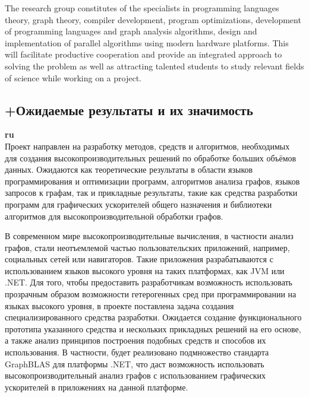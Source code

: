\documentclass[12pt]{article}  %
\theoremstyle{remark}
\begin{document}
The research group constitutes of the specialists in programming languages theory, graph theory, compiler development, program optimizations, development of programming languages and graph analysis algorithms, design and implementation of parallel algorithms using modern hardware platforms. This will facilitate productive cooperation and provide an integrated approach to solving the problem as well as attracting talented students to study relevant fields of science while working on a project.


\subsection{+Ожидаемые результаты и их значимость}

\textbf{ru}\\

Проект направлен на разработку методов, средств и алгоритмов, необходимых для создания высокопроизводительных решений по обработке больших объёмов данных. Ожидаются как теоретические результаты в области языков программирования и оптимизации программ, алгоритмов анализа графов, языков запросов к графам, так и прикладные результаты, такие как средства разработки программ для графических ускорителей общего назначения и библиотеки алгоритмов для высокопроизводительной обработки графов.

В современном мире высокопроизводительные вычисления, в частности анализ графов, стали неотъемлемой частью пользовательских приложений, например, социальных сетей или навигаторов. Такие приложения разрабатываются с использованием языков высокого уровня на таких платформах, как JVM или .NET. Для того, чтобы предоставить разработчикам возможность использовать прозрачным образом возможности гетерогенных сред при программировании на языках высокого уровня, в проекте поставлена задача создания специализированного средства разработки. 
Ожидается создание функционального прототипа указанного средства и нескольких прикладных решений на его основе, а также анализ принципов построения подобных средств и способов их использования.  В частности, будет реализовано подмножество стандарта GraphBLAS для платформы .NET, что даст возможность использовать высокопроизводительный анализ графов с использованием графических ускорителей в приложениях на данной платформе.
\end{document}
